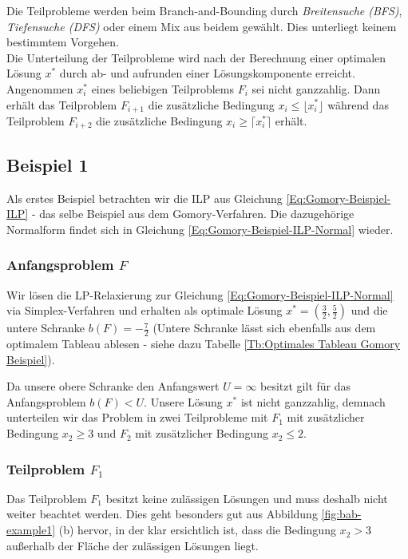 \documentclass[tog]{acmsiggraph}
\begin{document}
Die Teilprobleme werden beim Branch-and-Bounding durch \textit{Breitensuche (BFS)}, \textit{Tiefensuche (DFS)} oder einem Mix aus beidem gewählt. Dies unterliegt keinem bestimmtem Vorgehen.\\
Die Unterteilung der Teilprobleme wird nach der Berechnung einer optimalen Lösung $x^*$ durch ab- und aufrunden einer Lösungskomponente erreicht. Angenommen $x^*_i$ eines beliebigen Teilproblems $F_i$ sei nicht ganzzahlig. Dann erhält das Teilproblem $F_{i+1}$ die zusätzliche Bedingung $x_i \leq \lfloor x^*_i \rfloor$ während das Teilproblem $F_{i+2}$ die zusätzliche Bedingung $x_i \geq \lceil x^*_i \rceil$ erhält.

\subsection*{Beispiel 1}

Als erstes Beispiel betrachten wir die ILP aus Gleichung \ref{Eq:Gomory-Beispiel-ILP} - das selbe Beispiel aus dem Gomory-Verfahren. Die dazugehörige Normalform findet sich in Gleichung \ref{Eq:Gomory-Beispiel-ILP-Normal} wieder.

\subsubsection*{Anfangsproblem $F$}

Wir lösen die LP-Relaxierung zur Gleichung \ref{Eq:Gomory-Beispiel-ILP-Normal} via Simplex-Verfahren und erhalten als optimale Lösung $x^* = (\frac{3}{2}, \frac{5}{2})$ und die untere Schranke $b(F) = - \frac{7}{2}$ (Untere Schranke lässt sich ebenfalls aus dem optimalem Tableau ablesen - siehe dazu Tabelle \ref{Tb:Optimales Tableau Gomory Beispiel}).

Da unsere obere Schranke den Anfangswert $U = \infty$ besitzt gilt für das Anfangsproblem $b(F) < U$. Unsere Lösung $x^*$ ist nicht ganzzahlig, demnach unterteilen wir das Problem in zwei Teilprobleme mit $F_1$ mit zusätzlicher Bedingung $x_2 \geq 3$ und $F_2$ mit zusätzlicher Bedingung $x_2 \leq 2$.

\subsubsection*{Teilproblem $F_1$}

Das Teilproblem $F_1$ besitzt keine zulässigen Lösungen und muss deshalb nicht weiter beachtet werden. Dies geht besonders gut aus Abbildung \ref{fig:bab-example1} (b) hervor, in der klar ersichtlich ist, dass die Bedingung $x_2 > 3$ außerhalb der Fläche der zulässigen Lösungen liegt.
\end{document}
